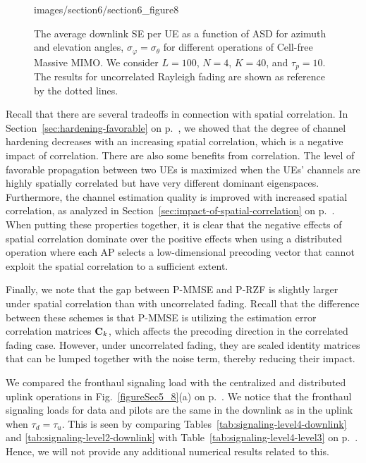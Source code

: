 \begin{figure}[t!]\centering
	\begin{overpic}[width=0.88\columnwidth,tics=10]{images/section6/section6_figure8}
	\end{overpic} 
	\caption{The average downlink SE per UE as a function of ASD for azimuth and elevation angles, $\sigma_{\varphi}=\sigma_{\theta}$ for different operations of Cell-free Massive MIMO. We consider $L=100$, $N=4$, $K=40$, and $\tau_p=10$. The results for uncorrelated Rayleigh fading are shown as reference by the dotted lines.}  
	\label{figureSec6_5} 
\end{figure}

\enlargethispage{\baselineskip}

Recall that there are several tradeoffs in connection with spatial correlation. In Section~\ref{sec:hardening-favorable} on p.~\pageref{sec:hardening-favorable}, we showed that the degree of channel hardening decreases with an increasing spatial correlation, which is a negative impact of correlation.
There are also some benefits from correlation.
The level of favorable propagation between two UEs is maximized when the UEs' channels are highly spatially correlated but have very different dominant eigenspaces. Furthermore, the channel estimation quality is improved with increased spatial correlation, as analyzed in Section~\ref{sec:impact-of-spatial-correlation} on p.~\pageref{sec:impact-of-spatial-correlation}. 
When putting these properties together, it is clear that the negative effects of spatial correlation dominate over the positive effects when using a distributed operation where each AP selects a low-dimensional precoding vector that cannot exploit the spatial correlation to a sufficient extent.

Finally, we note that the gap between P-MMSE and P-RZF is slightly larger under spatial correlation than with uncorrelated fading. Recall that the difference between these schemes is that P-MMSE is utilizing the estimation error correlation matrices $\mathbf{C}_k$, which affects the precoding direction in the correlated fading case. However, under uncorrelated fading, they are scaled identity matrices that can be lumped together with the noise term, thereby reducing their impact.

We compared the fronthaul signaling load with the centralized and distributed uplink operations in Fig.~\ref{figureSec5_8}(a) on p.~\pageref{figureSec5_8a}. We notice that the fronthaul signaling loads for data and pilots are the same in the downlink as in the uplink 
when $\tau_d=\tau_u$. This is seen by comparing Tables~\ref{tab:signaling-level4-downlink} and \ref{tab:signaling-level2-downlink} with Table~\ref{tab:signaling-level4-level3} on p.~\pageref{tab:signaling-level4-level3}. Hence, we will not provide any additional numerical results related to this.


